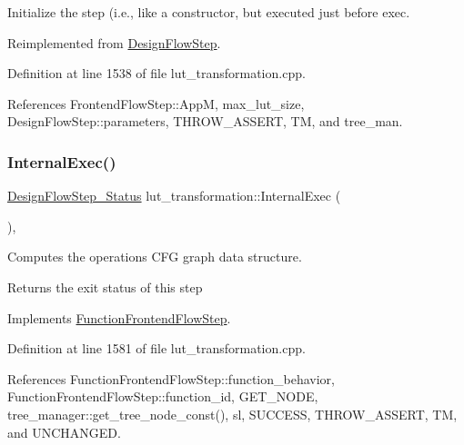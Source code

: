 Initialize the step (i.\+e., like a constructor, but executed just before exec. 



Reimplemented from \hyperlink{classDesignFlowStep_a44b50683382a094976e1d432a7784799}{Design\+Flow\+Step}.



Definition at line 1538 of file lut\+\_\+transformation.\+cpp.



References Frontend\+Flow\+Step\+::\+AppM, max\+\_\+lut\+\_\+size, Design\+Flow\+Step\+::parameters, T\+H\+R\+O\+W\+\_\+\+A\+S\+S\+E\+RT, TM, and tree\+\_\+man.

\mbox{\label{classlut__transformation_a63de4e9273d6ab51e6a8730192ff759c}} 
\subsubsection{\texorpdfstring{Internal\+Exec()}{InternalExec()}}
{\footnotesize\ttfamily \hyperlink{design__flow__step_8hpp_afb1f0d73069c26076b8d31dbc8ebecdf}{Design\+Flow\+Step\+\_\+\+Status} lut\+\_\+transformation\+::\+Internal\+Exec (\begin{DoxyParamCaption}{ }\end{DoxyParamCaption})\hspace{0.3cm}{\ttfamily [override]}, {\ttfamily [virtual]}}



Computes the operations C\+FG graph data structure. 

\begin{DoxyReturn}{Returns}
the exit status of this step 
\end{DoxyReturn}


Implements \hyperlink{classFunctionFrontendFlowStep_a00612f7fb9eabbbc8ee7e39d34e5ac68}{Function\+Frontend\+Flow\+Step}.



Definition at line 1581 of file lut\+\_\+transformation.\+cpp.



References Function\+Frontend\+Flow\+Step\+::function\+\_\+behavior, Function\+Frontend\+Flow\+Step\+::function\+\_\+id, G\+E\+T\+\_\+\+N\+O\+DE, tree\+\_\+manager\+::get\+\_\+tree\+\_\+node\+\_\+const(), sl, S\+U\+C\+C\+E\+SS, T\+H\+R\+O\+W\+\_\+\+A\+S\+S\+E\+RT, TM, and U\+N\+C\+H\+A\+N\+G\+ED.

